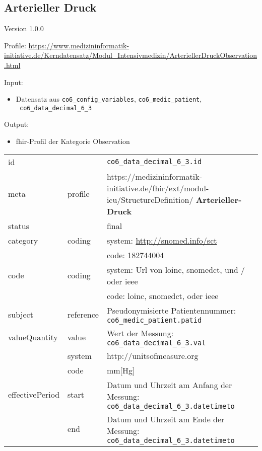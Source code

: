 \subsection{Arterieller Druck} 
\noindent Version 1.0.0

\noindent Profile: \url{https://www.medizininformatik-initiative.de/Kerndatensatz/Modul_Intensivmedizin/ArteriellerDruckObservation.html}

\noindent Input:
\begin{itemize}
	\item Datensatz aus \texttt{co6\_config\_variables}, \texttt{co6\_medic\_patient}, \\ \texttt{
co6\_data\_decimal\_6\_3}
\end{itemize}
Output:
\begin{itemize}
        \item \ac{fhir}-Profil der Kategorie \glqq Observation\grqq{}
\end{itemize}
\begin{longtable}{|l|l|p{7.5cm}|}
        \hline
        \rowcolor{lightgray} \multicolumn{3}{|l|}{Data Mapping (inhaltlich)} \\ \hline
        id &  & \texttt{co6\_data\_decimal\_6\_3.id} \\ \hline
	meta & profile & https://medizininformatik-initiative.de/fhir/ext/modul-icu/StructureDefinition/\textbf{
Arterieller-Druck} \\ \hline 
	status &  & final  \\ \hline 
	category & coding & system: \url{http://snomed.info/sct} \\
\cline{3-3}
	& & code: 182744004 \\ \hline
	code & coding & system: Url von \ac{loinc}, \ac{snomedct}, und / oder \ac{ieee} \\ 
	\cline{3-3} 
	 &  & code: \ac{loinc}, \ac{snomedct}, oder \ac{ieee} \\ \hline
	subject & reference & Pseudonymisierte Patientennummer: \texttt{co6\_medic\_patient.patid} \\ \hline
	valueQuantity & value & Wert der Messung: \texttt{
co6\_data\_decimal\_6\_3.val} \\
        \cline{2-3}
         & system & http://unitsofmeasure.org \\
         \cline{2-3}
         & code &
mm[Hg]
\\ \hline
    effectivePeriod & start & Datum und Uhrzeit am Anfang der Messung: \texttt{
co6\_data\_decimal\_6\_3.datetimeto} \\
    \cline{2-3}
     & end & Datum und Uhrzeit am Ende der Messung: \texttt{
co6\_data\_decimal\_6\_3.datetimeto} \\ \hline
\end{longtable}


